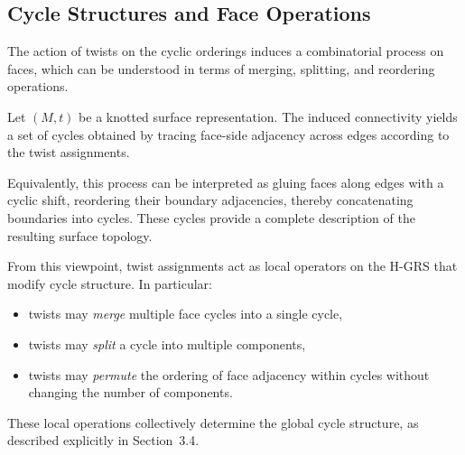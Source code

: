 \documentclass[acmtog]{acmart}
\begin{document}
\subsection{Cycle Structures and Face Operations}

The action of twists on the cyclic orderings induces a combinatorial
process on faces, which can be understood in terms of merging, splitting,
and reordering operations.

\begin{definition}
Let $(M, t)$ be a knotted surface representation. The induced connectivity yields a set of cycles obtained by tracing face-side adjacency across edges according to the twist assignments.
\end{definition}

Equivalently, this process can be interpreted as gluing faces along edges with a cyclic shift, reordering their boundary adjacencies, thereby concatenating boundaries into cycles. These cycles provide a complete description of
the resulting surface topology.

From this viewpoint, twist assignments act as local operators on the
H-GRS that modify cycle structure. In particular:
\begin{itemize}
    \item twists may \emph{merge} multiple face cycles into a single cycle,
    \item twists may \emph{split} a cycle into multiple components,
    \item twists may \emph{permute} the ordering of face adjacency within cycles without changing the
    number of components.
\end{itemize}

These local operations collectively determine the global cycle structure, as described explicitly in Section~3.4.
\end{document}
